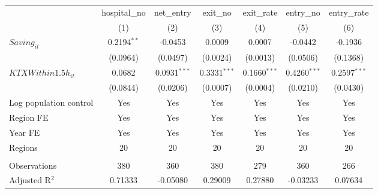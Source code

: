 \begingroup
\centering
\begin{tabular}{lcccccc}
   \toprule
                          & hospital\_no  & net\_entry     & exit\_no       & exit\_rate     & entry\_no      & entry\_rate \\    
                          & (1)           & (2)            & (3)            & (4)            & (5)            & (6)\\  
   \midrule 
   $Saving_{it}$          & 0.2194$^{**}$ & -0.0453        & 0.0009         & 0.0007         & -0.0442        & -0.1936\\   
                          & (0.0964)      & (0.0497)       & (0.0024)       & (0.0013)       & (0.0506)       & (0.1368)\\   
   $KTXWithin1.5h_{it}$   & 0.0682        & 0.0931$^{***}$ & 0.3331$^{***}$ & 0.1660$^{***}$ & 0.4260$^{***}$ & 0.2597$^{***}$\\   
                          & (0.0844)      & (0.0206)       & (0.0007)       & (0.0004)       & (0.0210)       & (0.0430)\\   
   Log population control & Yes           & Yes            & Yes            & Yes            & Yes            & Yes\\  
   Region FE              & Yes           & Yes            & Yes            & Yes            & Yes            & Yes\\  
   Year FE                & Yes           & Yes            & Yes            & Yes            & Yes            & Yes\\  
   Regions                & 20            & 20             & 20             & 20             & 20             & 20\\  
    \\
   Observations           & 380           & 360            & 380            & 279            & 360            & 266\\  
   Adjusted R$^2$         & 0.71333       & -0.05080       & 0.29009        & 0.27880        & -0.03233       & 0.07634\\  
   \bottomrule
\end{tabular}
\par\endgroup

